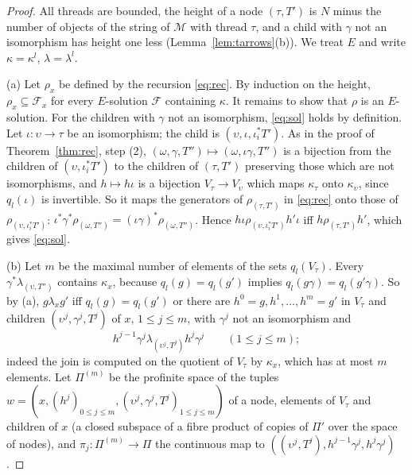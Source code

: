 \documentclass[11pt]{amsart}
\theoremstyle{definition}
\newcommand{\cM}{\mathcal M}
\begin{document}
\begin{proof}
All threads are bounded, the height of a node $(\tau,T')$ is $N$
minus the number of objects of the string of $\cM$ with thread
$\tau$, and a child with $\gamma$ not an isomorphism has height one
less (Lemma~\ref{lem:tarrows}(b)). We treat $E$ and write $\kappa=\kappa^l$,
$\lambda=\lambda^l$.

(a) Let $\rho_x$ be defined by the recursion \eqref{eq:rec}. By
induction on the height, $\rho_x\subseteq\mathcal F_x$ for every
$E$-solution $\mathcal F$ containing $\kappa$. It remains to show
that $\rho$ is an $E$-solution. For the children with $\gamma$ not an
isomorphism, \eqref{eq:sol} holds by definition. Let $\iota\colon
\upsilon\to\tau$ be an isomorphism; the child is
$(\upsilon,\iota,\iota_i^*T')$. As in the proof of Theorem~\ref{thm:rec}, step
(2), $(\omega,\gamma,T'')\mapsto(\omega,\iota\gamma,T'')$ is a
bijection from the children of $(\upsilon,\iota_i^*T')$ to the
children of $(\tau,T')$ preserving those which are not isomorphisms,
and $h\mapsto h\iota$ is a bijection $V_\tau\to V_\upsilon$ which
maps $\kappa_\tau$ onto $\kappa_\upsilon$, since $q_l(\iota)$ is
invertible. So it maps the generators of $\rho_{(\tau,T')}$ in
\eqref{eq:rec} onto those of $\rho_{(\upsilon,\iota_i^*T')}$:
$\iota^*\gamma^*\rho_{(\omega,T'')}=(\iota\gamma)^*\rho_{(\omega,
T'')}$. Hence $h\iota\mathrel{\rho_{(\upsilon,\iota_i^*T')}}h'\iota$
iff $h\mathrel{\rho_{(\tau,T')}}h'$, which gives \eqref{eq:sol}.

(b) Let $m$ be the maximal number of elements of the sets
$q_l(V_\tau)$. Every $\gamma^*\lambda_{(\upsilon,T'')}$ contains
$\kappa_x$, because $q_l(g)=q_l(g')$ implies $q_l(g\gamma)=q_l(g'
\gamma)$. So by (a), $g\mathrel{\lambda_x}g'$ iff $q_l(g)=q_l(g')$ or
there are $h^0=g,h^1,\dots,h^m=g'$ in $V_\tau$ and children
$(\upsilon^j,\gamma^j,T^j)$ of $x$, $1\le j\le m$, with $\gamma^j$
not an isomorphism and
\begin{equation}\label{eq:chain}
h^{j-1}\gamma^j\mathrel{\lambda_{(\upsilon^j,T^j)}}h^j\gamma^j
\qquad(1\le j\le m);
\end{equation}
indeed the join is computed on the quotient of $V_\tau$ by
$\kappa_x$, which has at most $m$ elements. Let $\Pi^{(m)}$ be the
profinite space of the tuples $w=(x,(h^j)_{0\le j\le m},
(\upsilon^j,\gamma^j,T^j)_{1\le j\le m})$ of a node, elements of
$V_\tau$ and children of $x$ (a closed subspace of a fibre product of
copies of $\Pi'$ over the space of nodes), and $\pi_j\colon\Pi^{(m)}
\to\Pi$ the continuous map to $((\upsilon^j,T^j),h^{j-1}\gamma^j,
h^j\gamma^j)$.


\end{proof}
\end{document}
